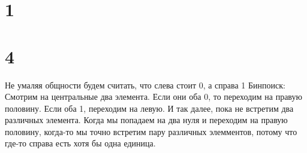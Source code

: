 \documentclass[12pt]{extarticle}
\begin{document}
\section*{1}


\section*{4}
Не умаляя общности будем считать, что слева стоит 0, а справа 1\newline
Бинпоиск: \newline
Смотрим на центральные два элемента. Если они оба 0, то переходим на правую половину. Если оба 1, переходим на левую. И так далее, пока не встретим два различных элемента.\newline
Когда мы попадаем на два нуля и переходим на правую половину, когда-то мы точно встретим пару различных элемментов, потому что где-то справа есть хотя бы одна единица.
\end{document}
